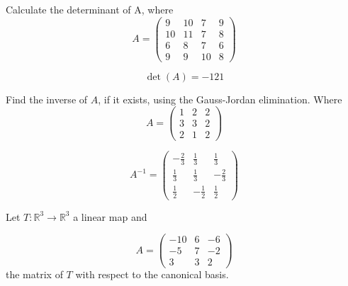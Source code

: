 \begin{questions}

\question Calculate the determinant of A, where
$$
A=\left(\begin{array}{rrrr}
9 & 10 & 7 & 9 \\
10 & 11 & 7 & 8 \\
6 & 8 & 7 & 6 \\
9 & 9 & 10 & 8
\end{array}\right)
$$

\begin{solution}
$$\det(A)=-121$$
\end{solution}

\question Find the inverse of $A$, if it exists, using the Gauss-Jordan elimination. Where
$$
A=\left(\begin{array}{rrr}
1 & 2 & 2 \\
3 & 3 & 2 \\
2 & 1 & 2
\end{array}\right)
$$

\begin{solution}
$$A^{-1}=\left(\begin{array}{rrr}
-\frac{2}{3} & \frac{1}{3} & \frac{1}{3} \\
\frac{1}{3} & \frac{1}{3} & -\frac{2}{3} \\
\frac{1}{2} & -\frac{1}{2} & \frac{1}{2}
\end{array}\right)$$
\end{solution}

\question Let $T:\mathbb{R}^3\rightarrow\mathbb{R}^3$  a linear map and
 
$$
A=\left(\begin{array}{rrr}
-10 & 6 & -6 \\
-5 & 7 & -2 \\
3 & 3 & 2
\end{array}\right)
$$
the matrix of $T$ with respect to the canonical basis.
\end{questions}
